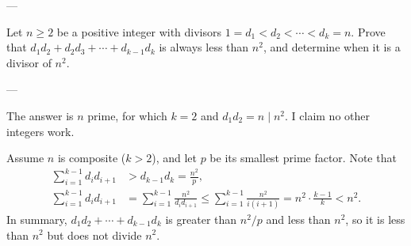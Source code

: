 
---

Let $n\ge2$ be a positive integer with divisors $1=d_1<d_2<\cdots<d_k=n$. Prove that $d_1d_2+d_2d_3+\cdots+d_{k-1}d_k$ is always less than $n^2$, and determine when it is a divisor of $n^2$.

---

The answer is $n$ prime, for which $k=2$ and $d_1d_2=n\mid n^2$. I claim no other integers work.

Assume $n$ is composite ($k>2$), and let $p$ be its smallest prime factor. Note that
\begin{align*}
    \sum_{i=1}^{k-1}d_id_{i+1}&>d_{k-1}d_k=\frac{n^2}p,\\
    \sum_{i=1}^{k-1}d_id_{i+1}&=\sum_{i=1}^{k-1}\frac{n^2}{d_id_{i+1}}\le\sum_{i=1}^{k-1}\frac{n^2}{i(i+1)}=n^2\cdot\frac{k-1}k<n^2.
\end{align*}
In summary, $d_1d_2+\cdots+d_{k-1}d_k$ is greater than $n^2/p$ and less than $n^2$, so it is less than $n^2$ but does not divide $n^2$.

